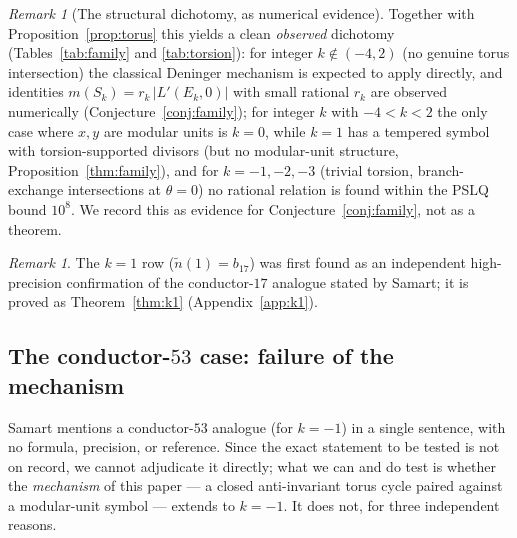 \documentclass[preprint,12pt]{elsarticle}
\theoremstyle{definition}
\theoremstyle{remark}
\newtheorem{remark}[theorem]{Remark}
\begin{document}
\begin{remark}[The structural dichotomy, as numerical evidence]
Together with Proposition~\ref{prop:torus} this yields a clean
\emph{observed} dichotomy (Tables~\ref{tab:family} and
\ref{tab:torsion}): for integer $k\notin(-4,2)$ (no genuine torus
intersection) the classical Deninger mechanism is expected to apply
directly, and identities $m(S_k)=r_k\,|L'(E_k,0)|$ with small rational
$r_k$ are observed numerically (Conjecture~\ref{conj:family}); for integer
$k$ with $-4<k<2$ the only case where $x,y$ are modular units is $k=0$,
while $k=1$ has a tempered symbol with torsion-supported divisors (but no
modular-unit structure, Proposition~\ref{thm:family}), and for
$k=-1,-2,-3$ (trivial torsion,
branch-exchange intersections at $\theta=0$) no rational relation is found
within the PSLQ bound $10^8$. We record this as evidence for
Conjecture~\ref{conj:family}, not as a theorem.
\end{remark}

\begin{remark}
The $k=1$ row ($\tilde n(1)=b_{17}$) was first found as an independent
high-precision confirmation of the conductor-$17$ analogue stated by Samart;
it is proved as Theorem~\ref{thm:k1} (Appendix~\ref{app:k1}).
\end{remark}

\subsection{The conductor-\texorpdfstring{$53$}{53} case: failure of the
mechanism}
\label{subsec:k53}

Samart \cite[\S 4]{Samart2023} mentions a conductor-$53$ analogue (for
$k=-1$) in a single sentence, with no formula, precision, or reference.
Since the exact statement to be tested is not on record, we cannot
adjudicate it directly; what we can and do test is whether the
\emph{mechanism} of this paper --- a closed anti-invariant torus cycle
paired against a modular-unit symbol --- extends to $k=-1$. It does not,
for three independent reasons.
\end{document}
